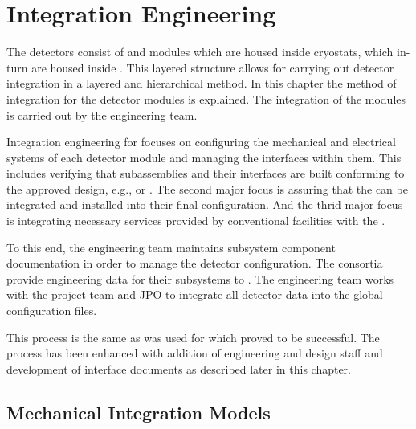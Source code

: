 \chapter{Integration Engineering}
\label{sec:fdsp-coord-integ-sysengr}


The  detectors consist of  and 
modules which are housed inside cryostats, which in-turn are housed
inside . This layered structure allows for carrying out
detector integration in a layered and hierarchical method. In this
chapter the method of integration for the detector modules is
explained.  The integration of the modules is carried out by the
 engineering team.

Integration engineering for  focuses on configuring the
mechanical and electrical systems of each detector module and managing
the interfaces within them. This includes verifying that subassemblies
and their interfaces are built conforming to the approved design,
e.g.,  or  . The second major focus
is assuring that the  can be integrated and
installed into their final configuration. And the thrid major focus is
integrating necessary services provided by conventional facilities
with the .


To this end, the  engineering team maintains subsystem
component documentation in order to manage the detector
configuration. The consortia provide engineering data for their
subsystems to . The  engineering team works with
the  project team and JPO to integrate all detector
data into the global  configuration files.

This process is the same as was used for  which proved to be
successful. The process has been enhanced with addition of engineering
and design staff and development of interface documents as described
later in this chapter.

\section{Mechanical Integration Models}
\label{sec:fdsp-coord-integ-models}

